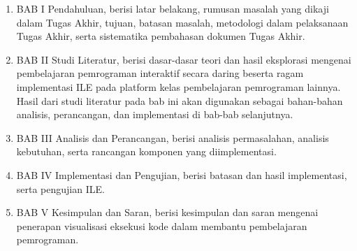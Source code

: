 \begin{enumerate}
      \item BAB I Pendahuluan, berisi latar belakang, rumusan masalah yang dikaji dalam Tugas Akhir, tujuan, batasan masalah, metodologi dalam pelaksanaan Tugas Akhir, serta sistematika pembahasan dokumen Tugas Akhir.
      \item BAB II Studi Literatur, berisi dasar-dasar teori dan hasil eksplorasi mengenai pembelajaran pemrograman interaktif secara daring beserta ragam implementasi ILE pada platform kelas pembelajaran pemrograman lainnya. Hasil dari studi literatur pada bab ini akan digunakan sebagai bahan-bahan analisis, perancangan, dan implementasi di bab-bab selanjutnya.
      \item BAB III Analisis dan Perancangan, berisi analisis permasalahan, analisis kebutuhan, serta rancangan komponen yang diimplementasi.
      \item BAB IV Implementasi dan Pengujian, berisi batasan dan hasil implementasi, serta pengujian ILE.
      \item BAB V Kesimpulan dan Saran, berisi kesimpulan dan saran mengenai penerapan visualisasi eksekusi kode dalam membantu pembelajaran pemrograman.
\end{enumerate}